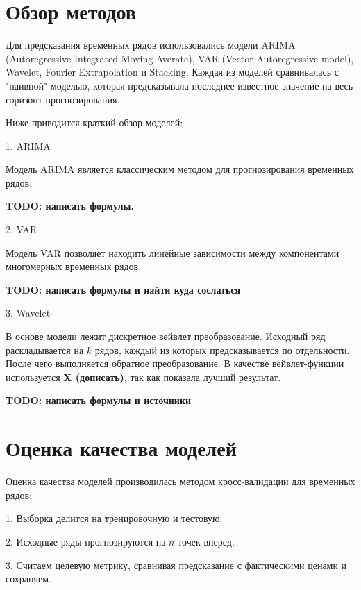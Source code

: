 \documentclass[a4paper,article,14pt]{extarticle}
\begin{document}

\section{Обзор методов}

Для предсказания временных рядов использовались модели ARIMA (Autoregressive Integrated Moving Averate), VAR (Vector Autoregressive model), Wavelet, Fourier Extrapolation и Stacking.
Каждая из моделей сравнивалась с "наивной" моделью, которая предсказывала последнее известное значение на весь горизонт прогнозирования.

\par
Ниже приводится краткий обзор моделей:

1.
ARIMA~\cite{arima}

Модель ARIMA является классическим методом для прогнозирования временных рядов.

\textbf{TODO: написать формулы.}

2.
VAR~\cite{var}

Модель VAR позволяет находить линейные зависимости между компонентами многомерных временных рядов.

\textbf{TODO: написать формулы и найти куда сослаться}

3.
Wavelet~\cite{wavelet}

В основе модели лежит дискретное вейвлет преобразование.
Исходный ряд раскладывается на $k$ рядов, каждый из которых предсказывается по отдельности.
После чего выполняется обратное преобразование.
В качестве вейвлет-функции используется \textbf{X (дописать)}, так как показала лучший результат.

\textbf{TODO: написать формулы и источники}


\section{Оценка качества моделей}

Оценка качества моделей производилась методом кросс-валидации для временных рядов:

1.
Выборка делится на тренировочную и тестовую.

2.
Исходные ряды прогнозируются на $n$ точек вперед.

3.
Считаем целевую метрику, сравнивая предсказание с фактическими ценами и сохраняем.
\end{document}
